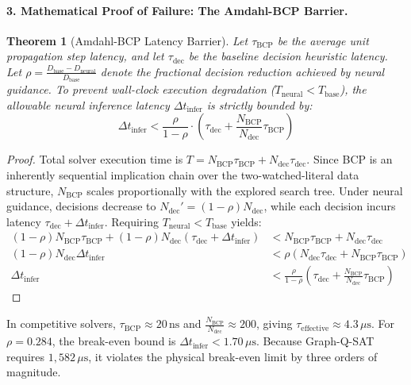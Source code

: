 \documentclass[11pt]{article}
\newtheorem{theorem}{Theorem}
\theoremstyle{definition}
\begin{document}
\paragraph{3. Mathematical Proof of Failure: The Amdahl-BCP Barrier.}
\begin{theorem}[Amdahl-BCP Latency Barrier]
Let $\tau_{\text{BCP}}$ be the average unit propagation step latency, and let $\tau_{\text{dec}}$ be the baseline decision heuristic latency. Let $\rho = \frac{D_{\text{base}} - D_{\text{neural}}}{D_{\text{base}}}$ denote the fractional decision reduction achieved by neural guidance. To prevent wall-clock execution degradation ($T_{\text{neural}} < T_{\text{base}}$), the allowable neural inference latency $\Delta t_{\text{infer}}$ is strictly bounded by:
\begin{equation}
\Delta t_{\text{infer}} < \frac{\rho}{1 - \rho} \cdot \left(\tau_{\text{dec}} + \frac{N_{\text{BCP}}}{N_{\text{dec}}} \tau_{\text{BCP}}\right)
\end{equation}
\end{theorem}
\begin{proof}
Total solver execution time is $T = N_{\text{BCP}} \tau_{\text{BCP}} + N_{\text{dec}} \tau_{\text{dec}}$. Since BCP is an inherently sequential implication chain over the two-watched-literal data structure, $N_{\text{BCP}}$ scales proportionally with the explored search tree. Under neural guidance, decisions decrease to $N_{\text{dec}}' = (1-\rho) N_{\text{dec}}$, while each decision incurs latency $\tau_{\text{dec}} + \Delta t_{\text{infer}}$. Requiring $T_{\text{neural}} < T_{\text{base}}$ yields:
\begin{align*}
(1-\rho) N_{\text{BCP}} \tau_{\text{BCP}} + (1-\rho) N_{\text{dec}} (\tau_{\text{dec}} + \Delta t_{\text{infer}}) &< N_{\text{BCP}} \tau_{\text{BCP}} + N_{\text{dec}} \tau_{\text{dec}} \\
(1-\rho) N_{\text{dec}} \Delta t_{\text{infer}} &< \rho \left(N_{\text{dec}} \tau_{\text{dec}} + N_{\text{BCP}} \tau_{\text{BCP}}\right) \\
\Delta t_{\text{infer}} &< \frac{\rho}{1-\rho} \left(\tau_{\text{dec}} + \frac{N_{\text{BCP}}}{N_{\text{dec}}} \tau_{\text{BCP}}\right)
\end{align*}
\end{proof}
In competitive solvers, $\tau_{\text{BCP}} \approx 20\,\text{ns}$ and $\frac{N_{\text{BCP}}}{N_{\text{dec}}} \approx 200$, giving $\tau_{\text{effective}} \approx 4.3\,\mu\text{s}$. For $\rho = 0.284$, the break-even bound is $\Delta t_{\text{infer}} < 1.70\,\mu\text{s}$. Because Graph-Q-SAT requires $1,582\,\mu\text{s}$, it violates the physical break-even limit by three orders of magnitude.
\end{document}
